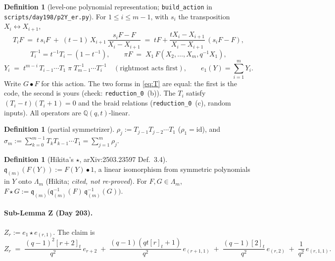 \documentclass[11pt]{article}
\newcommand{\qint}[1]{[#1]_t}
\newcommand{\Qq}{\mathbb{Q}(q,t)}
\newcommand{\bul}{\bullet}
\theoremstyle{definition}
\newtheorem{definition}[theorem]{Definition}
\begin{document}
\begin{definition}[level-one polynomial representation; \texttt{build\_action} in \texttt{scripts/day198/p2Y\_er.py}]
For $1\le i\le m-1$, with $s_i$ the transposition $X_i\leftrightarrow X_{i+1}$,
\begin{equation}\label{eq:T}
T_i F \;=\; t\, s_iF \;+\; (t-1)\,X_{i+1}\,\frac{s_iF-F}{X_i-X_{i+1}}
\;=\; tF+\frac{tX_i-X_{i+1}}{X_i-X_{i+1}}\,(s_iF-F),
\end{equation}
\[
T_i^{-1}=t^{-1}T_i-(1-t^{-1}),\qquad
\pi F \;=\; X_1\,F(X_2,\dots,X_m,q^{-1}X_1),
\]
\[
Y_i \;=\; t^{m-i}\,T_{i-1}\cdots T_1\;\pi\;T_{m-1}^{-1}\cdots T_i^{-1}
\quad(\text{rightmost acts first}),\qquad e_1(Y)=\textstyle\sum_{i=1}^m Y_i .
\]
Write $G\bul F$ for this action. The two forms in \eqref{eq:T} are equal: the first is the code, the second is yours
(check: \texttt{reduction\_0}~(b)). The $T_i$ satisfy $(T_i-t)(T_i+1)=0$ and the braid relations
(\texttt{reduction\_0}~(c), random inputs). All operators are $\Qq$-linear.
\end{definition}

\begin{definition}[partial symmetrizer]
$\rho_j:=T_{j-1}T_{j-2}\cdots T_1$ ($\rho_1=\mathrm{id}$), and
$\sigma_m:=\sum_{k=0}^{m-1}T_kT_{k-1}\cdots T_1=\sum_{j=1}^m\rho_j$.
\end{definition}

\begin{definition}[Hikita's $\star$, arXiv:2503.23597 Def.~3.4]
$\mathfrak q_{(m)}(F(Y)) := F(Y)\bul 1$, a linear isomorphism from symmetric
polynomials in $Y$ onto $\Lambda_m$ (Hikita; \emph{cited, not re-proved}). For $F,G\in\Lambda_m$,
$F\star G:=\mathfrak q_{(m)}\bigl(\mathfrak q_{(m)}^{-1}(F)\,\mathfrak q_{(m)}^{-1}(G)\bigr)$.
\end{definition}

\paragraph{Sub-Lemma Z (Day 203).} $Z_r:=e_1\star e_{(r,1)}$. The claim is
\begin{equation}\label{eq:Z}\tag{Z}
Z_r \;=\; \frac{(q-1)^2\qint{r+2}}{q^2}\,e_{r+2}
\;+\;\frac{(q-1)(qt\qint r+1)}{q^2}\,e_{(r+1,1)}
\;+\;\frac{(q-1)\qint2}{q^2}\,e_{(r,2)}
\;+\;\frac1{q^2}\,e_{(r,1,1)} .
\end{equation}
\end{document}
